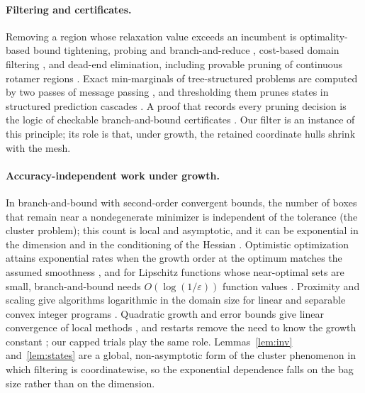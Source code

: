 \paragraph{Filtering and certificates.}
Removing a region whose relaxation value exceeds an incumbent is
optimality-based bound tightening, probing and branch-and-reduce
\cite{RyooSahinidis1996,BelottiEtAl2009,GleixnerEtAl2017,PuranikSahinidis2017},
cost-based domain filtering \cite{FocacciLodiMilano1999}, and dead-end
elimination, including provable pruning of continuous rotamer regions
\cite{DesmetEtAl1992,GainzaRobertsDonald2012}. Exact min-marginals of
tree-structured problems are computed by two passes of message passing
\cite{Dawid1992,AjiMcEliece2000,WainwrightJaakkolaWillsky2005,KohliTorr2006},
and thresholding them prunes states in structured prediction cascades
\cite{WeissTaskar2010}. A proof that records every pruning decision is the logic
of checkable branch-and-bound certificates \cite{CheungGleixnerSteffy2017}. Our
filter is an instance of this principle; its role is that, under growth, the
retained coordinate hulls shrink with the mesh.

\paragraph{Accuracy-independent work under growth.}
In branch-and-bound with second-order convergent bounds, the number of boxes
that remain near a nondegenerate minimizer is independent of the tolerance
(the cluster problem); this count is local and asymptotic, and it can be
exponential in the dimension and in the conditioning of the Hessian
\cite{DuKearfott1994,Neumaier2004,WechsungSchaberBarton2014,KannanBarton2017}.
Optimistic optimization attains exponential rates when the growth order at the
optimum matches the assumed smoothness \cite{Munos2011}, and for Lipschitz
functions whose near-optimal sets are small, branch-and-bound needs
$O(\log(1/\varepsilon))$ function values \cite{Perevozchikov1990}. Proximity and
scaling give algorithms logarithmic in the domain size for linear and
separable convex integer programs
\cite{CookGerardsSchrijverTardos1986,HochbaumShanthikumar1990,
GranotSkorinKapov1990,HunkenschroderEtAl2026,EisenbrandEtAl2025}. Quadratic
growth and error bounds give linear convergence of local methods
\cite{LuoTseng1993,KarimiNutiniSchmidt2016,DrusvyatskiyLewis2018,
NecoaraNesterovGlineur2019}, and restarts remove the need to know the growth
constant \cite{RouletDAspremont2020}; our capped trials play the same role.
Lemmas~\ref{lem:inv} and~\ref{lem:states} are a global, non-asymptotic form of
the cluster phenomenon in which filtering is coordinatewise, so the exponential
dependence falls on the bag size rather than on the dimension.

